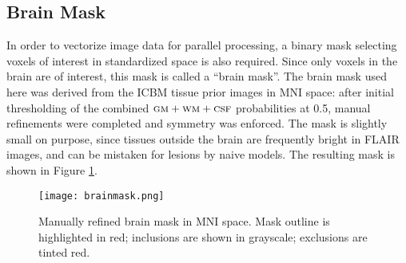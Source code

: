 \subsection{Brain Mask}\label{ss:brainmask}
In order to vectorize image data for parallel processing, a binary mask selecting voxels of interest in standardized space is also required. Since only voxels in the brain are of interest, this mask is called a ``brain mask''. The brain mask used here was derived from the ICBM tissue prior images \cite{Mazziotta2001} in MNI space: after initial thresholding of the combined $\textsc{gm}+\textsc{wm}+\textsc{csf}$ probabilities at 0.5, manual refinements were completed and symmetry was enforced. The mask is slightly small on purpose, since tissues outside the brain are frequently bright in FLAIR images, and can be mistaken for lesions by naive models. The resulting mask is shown in Figure \ref{fig:brainmask}.
\begin{figure}
  \centering
  \texttt{[image: brainmask.png]}
  \caption{Manually refined brain mask in MNI space. Mask outline is highlighted in red; inclusions are shown in grayscale; exclusions are tinted red.}
  \label{fig:brainmask}
\end{figure}
